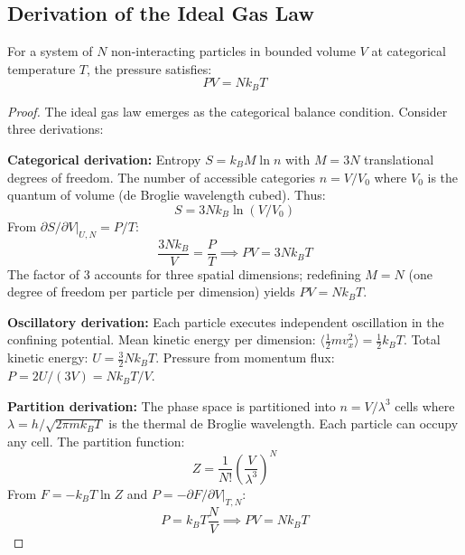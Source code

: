 \subsection{Derivation of the Ideal Gas Law}

\begin{theorem}
\label{thm:ideal_gas_law}
For a system of $N$ non-interacting particles in bounded volume $V$ at categorical temperature $T$, the pressure satisfies:
\begin{equation}
PV = Nk_BT
\label{eq:ideal_gas_law}
\end{equation}
\end{theorem}

\begin{proof}
The ideal gas law emerges as the categorical balance condition. Consider three derivations:

\textbf{Categorical derivation:}
Entropy $S = k_B M \ln n$ with $M = 3N$ translational degrees of freedom. The number of accessible categories $n = V/V_0$ where $V_0$ is the quantum of volume (de Broglie wavelength cubed). Thus:
\begin{equation}
S = 3Nk_B \ln(V/V_0)
\end{equation}
From $\partial S/\partial V|_{U,N} = P/T$:
\begin{equation}
\frac{3Nk_B}{V} = \frac{P}{T} \implies PV = 3Nk_BT
\end{equation}
The factor of 3 accounts for three spatial dimensions; redefining $M = N$ (one degree of freedom per particle per dimension) yields $PV = Nk_BT$.

\textbf{Oscillatory derivation:}
Each particle executes independent oscillation in the confining potential. Mean kinetic energy per dimension: $\langle \frac{1}{2}mv_x^2\rangle = \frac{1}{2}k_BT$. Total kinetic energy: $U = \frac{3}{2}Nk_BT$. Pressure from momentum flux: $P = 2U/(3V) = Nk_BT/V$.

\textbf{Partition derivation:}
The phase space is partitioned into $n = V/\lambda^3$ cells where $\lambda = h/\sqrt{2\pi mk_BT}$ is the thermal de Broglie wavelength. Each particle can occupy any cell. The partition function:
\begin{equation}
Z = \frac{1}{N!}\left(\frac{V}{\lambda^3}\right)^N
\end{equation}
From $F = -k_BT\ln Z$ and $P = -\partial F/\partial V|_{T,N}$:
\begin{equation}
P = k_BT \frac{N}{V} \implies PV = Nk_BT
\end{equation}
\end{proof}

